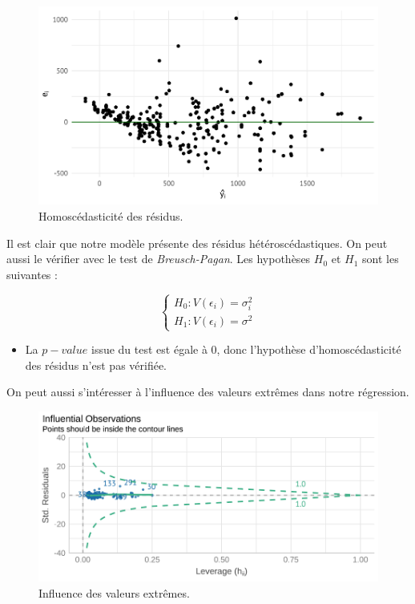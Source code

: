 \documentclass[
  12pt,
]{report}
\providecommand{\tightlist}{%
  \setlength{\itemsep}{0pt}\setlength{\parskip}{0pt}}\usepackage{longtable,booktabs,array}
\begin{document}
\begin{figure}[H]

{\centering \includegraphics{report_files/figure-pdf/level_hetero-1.pdf}

}

\caption{Homoscédasticité des résidus.}

\end{figure}%

Il est clair que notre modèle présente des résidus hétéroscédastiques.
On peut aussi le vérifier avec le test de \emph{Breusch-Pagan}. Les
hypothèses \(H_0\) et \(H_1\) sont les suivantes :

\[
\begin{cases}
H_0 : V(\epsilon_i) = \sigma^2_i\\
H_1 : V(\epsilon_i) = \sigma^2
\end{cases}
\]

\vspace{1em}

\begin{itemize}
\tightlist
\item
  La \(p-value\) issue du test est égale à 0, donc l'hypothèse
  d'homoscédasticité des résidus n'est pas vérifiée.
\end{itemize}

On peut aussi s'intéresser à l'influence des valeurs extrêmes dans notre
régression.

\begin{figure}[H]

{\centering \includegraphics{report_files/figure-pdf/outliers_level-1.pdf}

}

\caption{Influence des valeurs extrêmes.}

\end{figure}%
\end{document}
